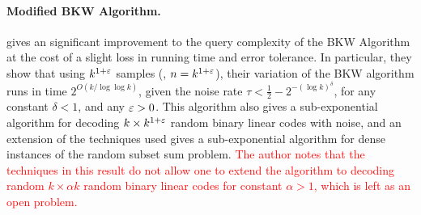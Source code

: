 %
%

\paragraph{Modified BKW Algorithm.} \cite{Lyubashevsky05} gives an significant improvement to the query complexity of the BKW Algorithm at the cost of a slight loss in running time and error tolerance.
In particular, they show that using $k^{1+\varepsilon}$ samples (\ie, $n = k^{1+\varepsilon}$), their variation of the BKW algorithm runs in time $2^{O(k/\log\log k)}$, given the noise rate $\tau < \frac{1}{2} - 2^{-(\log k)^\delta}$, for any constant $\delta < 1$, and any $\varepsilon > 0$.
This algorithm also gives a sub-exponential algorithm for decoding $k\times k^{1+\varepsilon}$ random binary linear codes with noise, and an extension of the techniques used gives a sub-exponential algorithm for dense instances of the random subset sum problem.
\textcolor{red}{The author notes that the techniques in this result do not allow one to extend the algorithm to decoding random $k \times \alpha k$ random binary linear codes for constant $\alpha > 1$, which is left as an open problem.}

